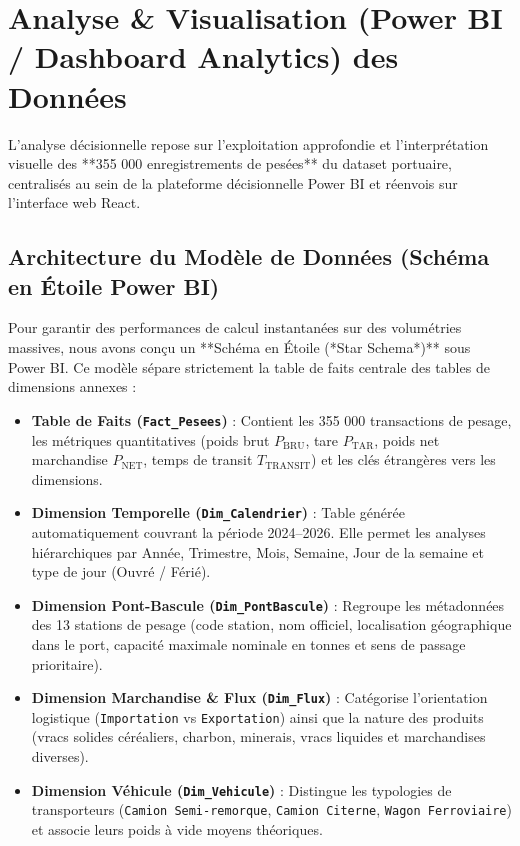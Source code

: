 \documentclass[12pt,a4paper,oneside]{report}
\begin{document}
\section{Analyse \& Visualisation (Power BI / Dashboard Analytics) des Données}

L'analyse décisionnelle repose sur l'exploitation approfondie et l'interprétation visuelle des **355 000 enregistrements de pesées** du dataset portuaire, centralisés au sein de la plateforme décisionnelle Power BI et réenvois sur l'interface web React.

\subsection{Architecture du Modèle de Données (Schéma en Étoile Power BI)}
Pour garantir des performances de calcul instantanées sur des volumétries massives, nous avons conçu un **Schéma en Étoile (*Star Schema*)** sous Power BI. Ce modèle sépare strictement la table de faits centrale des tables de dimensions annexes :

\begin{itemize}
    \item \textbf{Table de Faits (\texttt{Fact\_Pesees})} : Contient les 355 000 transactions de pesage, les métriques quantitatives (poids brut $P_{\text{BRU}}$, tare $P_{\text{TAR}}$, poids net marchandise $P_{\text{NET}}$, temps de transit $T_{\text{TRANSIT}}$) et les clés étrangères vers les dimensions.
    \item \textbf{Dimension Temporelle (\texttt{Dim\_Calendrier})} : Table générée automatiquement couvrant la période 2024–2026. Elle permet les analyses hiérarchiques par Année, Trimestre, Mois, Semaine, Jour de la semaine et type de jour (Ouvré / Férié).
    \item \textbf{Dimension Pont-Bascule (\texttt{Dim\_PontBascule})} : Regroupe les métadonnées des 13 stations de pesage (code station, nom officiel, localisation géographique dans le port, capacité maximale nominale en tonnes et sens de passage prioritaire).
    \item \textbf{Dimension Marchandise \& Flux (\texttt{Dim\_Flux})} : Catégorise l'orientation logistique (\texttt{Importation} vs \texttt{Exportation}) ainsi que la nature des produits (vracs solides céréaliers, charbon, minerais, vracs liquides et marchandises diverses).
    \item \textbf{Dimension Véhicule (\texttt{Dim\_Vehicule})} : Distingue les typologies de transporteurs (\texttt{Camion Semi-remorque}, \texttt{Camion Citerne}, \texttt{Wagon Ferroviaire}) et associe leurs poids à vide moyens théoriques.
\end{itemize}
\end{document}
